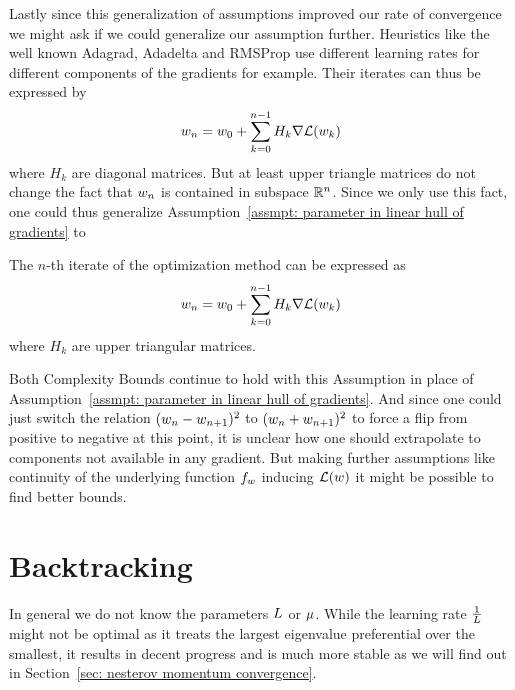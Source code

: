 Lastly since this generalization of assumptions improved our rate of convergence
we might ask if we could generalize our assumption further. Heuristics like
the well known Adagrad, Adadelta and RMSProp use different learning rates for
different components of the gradients for example. Their iterates can thus
be expressed by
%
\begin{align*}
	w_n = w_0 + \sum_{k=0}^{n-1} H_k \nabla\mathcal{L}(w_k)
\end{align*}
%
where \(H_k\) are diagonal matrices. But at least upper triangle matrices do
not change the fact that \(w_n\) is contained in subspace \(\mathbb{R}^n\).
Since we only use this fact, one could thus generalize Assumption~\ref{assmpt:
parameter in linear hull of gradients} to
%
\begin{assumption}
	\label{assmpt: parameter in generalized linear hull of gradients}
	The \(n\)-th iterate of the optimization method can be expressed as
	\begin{align*}
		w_n = w_0 + \sum_{k=0}^{n-1} H_k \nabla\mathcal{L}(w_k)
	\end{align*}
	where \(H_k\) are upper triangular matrices.
\end{assumption}

Both Complexity Bounds continue to hold with this Assumption in place of
Assumption~\ref{assmpt: parameter in linear hull of gradients}. And since one
could just switch the relation \((w_n-w_{n+1})^2\) to
\((w_n+w_{n+1})^2\) to force a flip from positive to negative
at this point, it is unclear how one should extrapolate to components not
available in any gradient. But making further assumptions like continuity of
the underlying function \(f_{w}\) inducing \(\mathcal{L}(w)\) it might
be possible to find better bounds.

\section{Backtracking}\label{sec: backtracking}

In general we do not know the parameters \(L\) or \(\mu\). While
the learning rate \(\tfrac1{L}\) might not be optimal as it treats the largest
eigenvalue preferential over the smallest, it results in decent progress and
is much more stable as we will find out in Section~\ref{sec: nesterov momentum convergence}.

